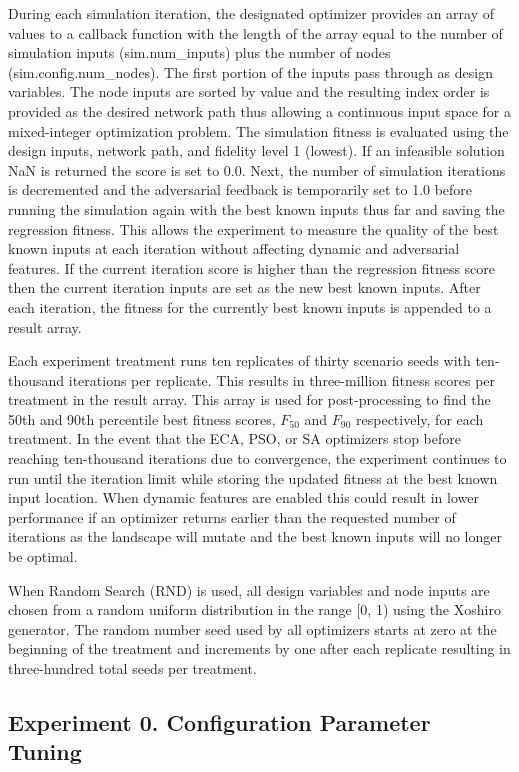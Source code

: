 \documentclass[a4paper]{article}
\begin{document}
During each simulation iteration, the designated optimizer provides an array of values to a callback function with the length of the array equal to the number of simulation inputs (sim.num\_inputs) plus the number of nodes (sim.config.num\_nodes). The first portion of the inputs pass through as design variables. The node inputs are sorted by value and the resulting index order is provided as the desired network path thus allowing a continuous input space for a mixed-integer optimization problem. The simulation fitness is evaluated using the design inputs, network path, and fidelity level 1 (lowest). If an infeasible solution NaN is returned the score is set to 0.0. Next, the number of simulation iterations is decremented and the adversarial feedback is temporarily set to 1.0 before running the simulation again with the best known inputs thus far and saving the regression fitness. This allows the experiment to measure the quality of the best known inputs at each iteration without affecting dynamic and adversarial features. If the current iteration score is higher than the regression fitness score then the current iteration inputs are set as the new best known inputs. After each iteration, the fitness for the currently best known inputs is appended to a result array.

Each experiment treatment runs ten replicates of thirty scenario seeds with ten-thousand iterations per replicate. This results in three-million fitness scores per treatment in the result array. This array is used for post-processing to find the 50th and 90th percentile best fitness scores, $F_{50}$ and $F_{90}$ respectively, for each treatment. In the event that the ECA, PSO, or SA optimizers stop before reaching ten-thousand iterations due to convergence, the experiment continues to run until the iteration limit while storing the updated fitness at the best known input location. When dynamic features are enabled this could result in lower performance if an optimizer returns earlier than the requested number of iterations as the landscape will mutate and the best known inputs will no longer be optimal.

When Random Search (RND) is used, all design variables and node inputs are chosen from a random uniform distribution in the range [0, 1) using the Xoshiro generator. The random number seed used by all optimizers starts at zero at the beginning of the treatment and increments by one after each replicate resulting in three-hundred total seeds per treatment.


\subsection{Experiment 0. Configuration Parameter Tuning}
\label{configparams}
\end{document}
